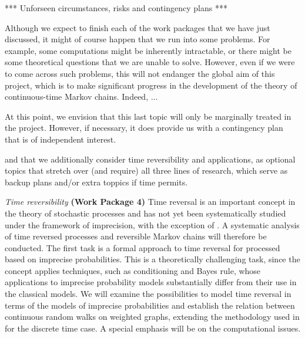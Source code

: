 \documentclass[11pt,dvipsnames,usenames,a4paper]{article}
\begin{document}
*** Unforseen circumstances, risks and contingency plans ***

Although we expect to finish each of the work packages that we have just discussed, it might of course happen that we run into some problems. For example, some computations might be inherently intractable, or there might be some theoretical questions that we are unable to solve. However, even if we were to come across such problems, this will not endanger the global aim of this project, which is to make significant progress in the development of the theory of continuous-time Markov chains. Indeed, ...



At this point, we envision that this last topic will only be marginally treated in the project. However, if necessary, it does provide us with a contingency plan that is of independent interest.


and that we additionally consider time reversibility and applications, as optional topics that stretch over (and require) all three lines of research, which serve as backup plans and/or extra toppics if time permits.

\emph{Time reversibility} {\bf (Work Package 4)} 
Time reversal is an important concept in the theory of stochastic processes and has not yet been systematically studied under the framework of imprecision, with the exception of \cite{skulj:16}. A systematic analysis of time reversed processes and reversible Markov chains will therefore be conducted. The first task is a formal approach to time reversal for processed based on imprecise probabilities. This is a theoretically challenging task, since the concept applies techniques, such as conditioning and Bayes rule, whose applications to imprecise probability models substantially differ from their use in the classical models. We will examine the possibilities to model time reversal in terms of the models of imprecise probabilities and establish the relation between continuous random walks on weighted graphs, extending the methodology used in  \cite{skulj:16} for the discrete time case. A special emphasis will be on the computational issues. 
\end{document}

